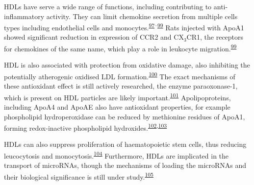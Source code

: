 \documentclass[
]{article}
\begin{document}
HDLs have serve a wide range of functions, including contributing to anti-inflammatory activity.
They can limit chemokine secretion from multiple cells types including endothelial cells and monocytes.\textsuperscript{\protect\hyperlink{ref-cockerill_gillian_w_high-density_1995}{97}--\protect\hyperlink{ref-bursill_christina_a_high-density_2010}{99}}
Rats injected with ApoA1 showed significant reduction in expression of CCR2 and CX\(_3\)CR1, the receptors for chemokines of the same name, which play a role in leukocyte migration.\textsuperscript{\protect\hyperlink{ref-bursill_christina_a_high-density_2010}{99}}

HDL is also associated with protection from oxidative damage, also inhibiting the potentially atherogenic oxidised LDL formation.\textsuperscript{\protect\hyperlink{ref-anatol_small_2003}{100}}
The exact mechanisms of these antioxidant effect is still actively researched, the enzyme paraoxonase-1, which is present on HDL particles are likely important.\textsuperscript{\protect\hyperlink{ref-mackness_role_2004}{101}}
Apolipoproteins, including ApoA4 and ApoAE also have antioxidant properties, for example phospholipid hydroperoxidase can be reduced by methionine residues of ApoA1, forming redox-inactive phospholipid hydroxides.\textsuperscript{\protect\hyperlink{ref-christison_exchange_1995}{102},\protect\hyperlink{ref-zerrad-saadi_amal_hdl3-mediated_2009}{103}}

HDLs can also suppress proliferation of haematopoietic stem cells, thus reducing leucocytosis and monocytosis.\textsuperscript{\protect\hyperlink{ref-yvan-charvet_atp-binding_2010}{104}}
Furthermore, HDLs are implicated in the transport of microRNAs, though the mechanisms of loading the microRNAs and their biological significance is still under study.\textsuperscript{\protect\hyperlink{ref-vickers_micrornas_2011}{105}}
\end{document}
